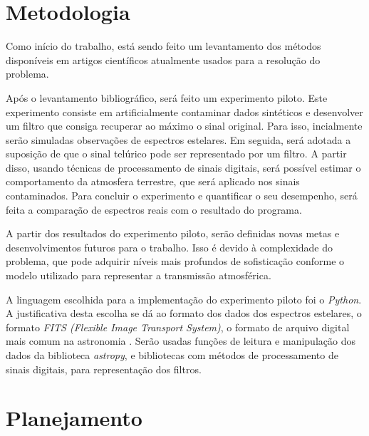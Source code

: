 \documentclass[11pt,twoside,a4paper]{article}
\begin{document}
\newpage
\section{Metodologia}
\doublespacing
Como início do trabalho, está sendo feito um levantamento dos métodos disponíveis em artigos científicos atualmente usados para a resolução do problema. 

Após o levantamento bibliográfico, será feito um experimento piloto. Este experimento consiste em artificialmente contaminar dados sintéticos e desenvolver um filtro que consiga recuperar ao máximo o sinal original. Para isso, incialmente serão simuladas observações de espectros estelares. Em seguida, será adotada a suposição de que o sinal telúrico pode ser representado por um filtro. A partir disso, usando técnicas de processamento de sinais digitais, será possível estimar o comportamento da atmosfera terrestre, que será aplicado nos sinais contaminados. Para concluir o experimento e quantificar o seu desempenho, será feita a comparação de espectros reais com o resultado do programa.

A partir dos resultados do experimento piloto, serão definidas novas metas e desenvolvimentos futuros para o trabalho. Isso é devido à complexidade do problema, que pode adquirir níveis mais profundos de sofisticação conforme o modelo utilizado para representar a transmissão atmosférica.

A linguagem escolhida para a implementação do experimento piloto foi o \textit{Python}. A justificativa desta escolha se dá ao formato dos dados dos espectros estelares, o formato \textit{FITS (Flexible Image Transport System)}, o formato de arquivo digital mais comum na astronomia \cite{2010A&A...524A..42P}. Serão usadas funções de leitura e manipulação dos dados da biblioteca \textit{astropy}, e bibliotecas com métodos de processamento de sinais digitais, para representação dos filtros.



\newpage
\section{Planejamento}\label{sec:planejamento}
\doublespacing
\end{document}
